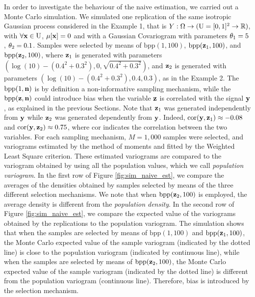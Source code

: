 In order to investigate the behaviour of the naive estimation, we carried out a Monte Carlo simulation. We simulated one replication of the same isotropic Gaussian process considered in the Example 1, that is $Y:\Omega\to(\mathrm{U}=[0,1]^2\to\mathbb{R})$, with $\forall \mathbf{x}\in\mathrm{U}$, $\mathrm{\mu}[\mathbf{x}]=0$ and with a Gaussian Covariogram with parameters $\theta_1=5$, $\theta_2=0.1$. Samples were selected by means of $\mathrm{bpp}(1, 100)$, $\mathrm{bpp}(\mathbf{z}_{1}, 100)$, and $\mathrm{bpp}(\mathbf{z}_{2}, 100)$, where  $\mathbf{\mathbf{z}}_{1}$ is generated with parameters $(\log(10)-(0.4^2+0.3^2),0,\sqrt{0.4^2+0.3^2})$, and $\mathbf{\mathbf{z}}_{2}$ is generated with parameters  $(\log(10)-(0.4^2+0.3^2),0.4,0.3)$, as in the Example 2.
The $\mathrm{bpp}(1, \mathbf{n})$ is by definition a non-informative sampling mechanism, while the $\mathrm{bpp}(\mathbf{z}, \mathbf{n})$ could introduce bias when the variable $\mathbf{z}$ is correlated with the signal $\mathbf{y}$, as explained in the previous Sections. Note that $\mathbf{z}_{1}$ was generated independently from $\mathbf{y}$ while $\mathbf{z}_{2}$ was generated dependently from $\mathbf{y}$. Indeed, $\mathrm{cor}(\mathbf{y}, \mathbf{z}_{1})\approx -0.08$ and $\mathrm{cor}(\mathbf{y}, \mathbf{z}_{2})\approx 0.75$, where $\mathrm{cor}$ indicates the correlation between the two variables. For each sampling mechanism, $M=1,000$ samples were selected, and variograms estimated by the method of moments and fitted by the Weighted Least Square criterion. These estimated variograms are compared to the variogram obtained by using all the population values, which we call \emph{population variogram}. In the first row of Figure \ref{fig:sim_naive_est}, we compare the averages of the densities obtained by samples selected by means of the three different selection mechanisms. We note that when $\mathrm{bpp}(\mathbf{z}_{2}, 100)$ is employed, the average density is different from the \emph{population density}. In the second row of Figure \ref{fig:sim_naive_est}, we compare the expected value of the variograms obtained by the replications to the population variogram. The simulation shows that when the samples are selected by means of $\mathrm{bpp}(1, 100)$ and $\mathrm{bpp}(\mathbf{z}_{1}, 100)$, the Monte Carlo expected value of the sample variogram (indicated by the dotted line) is close to the population variogram (indicated by continuous line), while when the samples are selected by means of $\mathrm{bpp}(\mathbf{z}_{2}, 100)$, the Monte Carlo expected value of the sample variogram (indicated by the dotted line) is  different from the population variogram (continuous line). Therefore, bias is introduced by the selection mechanism.

